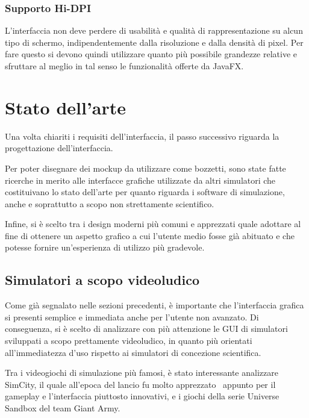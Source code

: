             \subsubsection{Supporto Hi-DPI}\label{subsubsec:hidpi}
                L'interfaccia non deve perdere di usabilità e qualità di rappresentazione su alcun tipo di schermo, indipendentemente dalla risoluzione e dalla densità di pixel.
                Per fare questo si devono quindi utilizzare quanto più possibile grandezze relative e sfruttare al meglio in tal senso le funzionalità offerte da JavaFX.

    \section{Stato dell'arte}\label{sec:ispirazione}
        Una volta chiariti i requisiti dell'interfaccia, il passo successivo riguarda la progettazione dell'interfaccia.

        Per poter disegnare dei mockup da utilizzare come bozzetti, sono state fatte ricerche in merito alle interfacce grafiche utilizzate da altri simulatori che costituivano lo stato dell'arte per quanto riguarda i software di simulazione, anche e soprattutto a scopo non strettamente scientifico.

        Infine, si è scelto tra i design moderni più comuni e apprezzati quale adottare al fine di ottenere un aspetto grafico a cui l'utente medio fosse già abituato e che potesse fornire un'esperienza di utilizzo più gradevole.

        \subsection{Simulatori a scopo videoludico}\label{subsec:videogame}
            Come già segnalato nelle sezioni precedenti, è importante che l'interfaccia grafica si presenti semplice e immediata anche per l'utente non avanzato.
            Di conseguenza, si è scelto di analizzare con più attenzione le GUI di simulatori sviluppati a scopo prettamente videoludico, in quanto più orientati all'immediatezza d'uso rispetto ai simulatori di concezione scientifica.

            Tra i videogiochi di simulazione più famosi, è stato interessante analizzare SimCity, il quale all'epoca del lancio fu molto apprezzato~\cite{friedman1995} appunto per il gameplay e l'interfaccia piuttosto innovativi, e i giochi della serie Universe Sandbox del team Giant Army.

